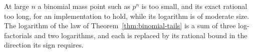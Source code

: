 
At large $n$ a binomial mass point such as $p^{n}$ is too small, and its
exact rational too long, for an implementation to hold, while its logarithm
is of moderate size. The logarithm of the law of Theorem~\ref{thm:binomial-tails} is a sum of
three log-factorials and two logarithms, and each is replaced by its
rational bound in the direction its sign requires.

